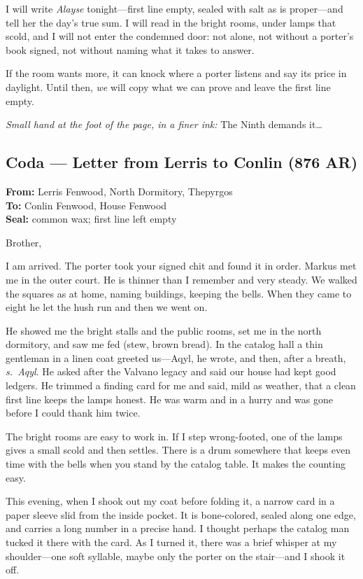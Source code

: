 \documentclass[11pt]{article}
\begin{document}
I will write \textit{Alayse} tonight—first line empty, sealed with salt as is proper—and tell her the day’s true sum. I will read in the bright rooms, under lamps that scold, and I will not enter the condemned door: not alone, not without a porter’s book signed, not without naming what it takes to answer.

If the room wants more, it can knock where a porter listens and say its price in daylight. Until then, \textit{we} will copy what we can prove and leave the first line empty.

\medskip
\noindent\textit{Small hand at the foot of the page, in a finer ink:} The Ninth demands it\ldots{}

\subsection*{Coda — Letter from Lerris to Conlin (876 AR)}

\noindent\textbf{From:} Lerris Fenwood, North Dormitory, Thepyrgos \\
\textbf{To:} Conlin Fenwood, House Fenwood \\
\textbf{Seal:} common wax; first line left empty

\medskip
\noindent Brother,

I am arrived. The porter took your signed chit and found it in order. Markus met me in the outer court. He is thinner than I remember and very steady. We walked the squares as at home, naming buildings, keeping the bells. When they came to eight he let the hush run and then we went on.

He showed me the bright stalls and the public rooms, set me in the north dormitory, and saw me fed (stew, brown bread). In the catalog hall a thin gentleman in a linen coat greeted us—Aqyl, he wrote, and then, after a breath, \emph{s.\ Aqyl}. He asked after the Valvano legacy and said our house had kept good ledgers. He trimmed a finding card for me and said, mild as weather, that a clean first line keeps the lamps honest. He was warm and in a hurry and was gone before I could thank him twice.

The bright rooms are easy to work in. If I step wrong-footed, one of the lamps gives a small scold and then settles. There is a drum somewhere that keeps even time with the bells when you stand by the catalog table. It makes the counting easy.

This evening, when I shook out my coat before folding it, a narrow card in a paper sleeve slid from the inside pocket. It is bone-colored, sealed along one edge, and carries a long number in a precise hand. I thought perhaps the catalog man tucked it there with the card. As I turned it, there was a brief whisper at my shoulder—one soft syllable, maybe only the porter on the stair—and I shook it off.
\end{document}
